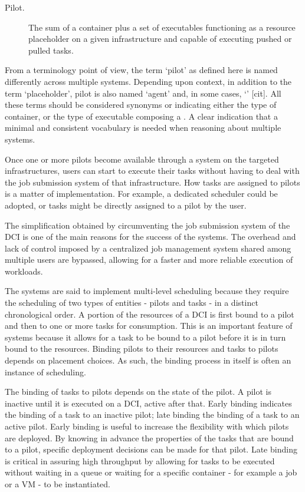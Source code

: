 \documentclass{sig-alternate}
\begin{document}
\begin{description}

\item[Pilot.] The sum of a container plus a set of executables
functioning as a resource placeholder on a given infrastructure and
capable of executing pushed or pulled tasks.


\end{description}

From a terminology point of view, the term `pilot' as defined here is
named differently across multiple \pilotjob systems. Depending upon
context, in addition to the term `placeholder', pilot is also named
`agent' and, in some cases, `\pilotjob' [cit]. All these terms should be
considered synonyms or indicating either the type of container, or the
type of executable composing a \pilot. A clear indication that a minimal
and consistent vocabulary is needed when reasoning about multiple
\pilotjob systems.

Once one or more pilots become available through a \pilotjob system on the
targeted infrastructures, users can start to execute their tasks without
having to deal with the job submission system of that infrastructure.
How tasks are assigned to pilots is a matter of implementation. For example, a
dedicated scheduler could be adopted, or tasks might be directly assigned to a
pilot by the user.

The simplification obtained by circumventing the job submission system of the
DCI is one of the main reasons for the success of the \pilotjob systems. The
overhead and lack of control imposed by a centralized job management system
shared among multiple users are bypassed, allowing for a faster and more
reliable execution of workloads.

The \pilotjob systems are said to implement multi-level scheduling
because they require the scheduling of two types of entities - pilots
and tasks - in a distinct chronological order. A portion of the
resources of a DCI is first bound to a pilot and then to one or more
tasks for consumption. This is an important feature of \pilotjob systems
because it allows for a task to be bound to a pilot before it is in turn
bound to the resources. Binding pilots to their resources and tasks to
pilots depends on placement choices. As such, the binding process in
itself is often an instance of scheduling.

The binding of tasks to pilots depends on the state of the pilot. A pilot is
inactive until it is executed on a DCI, active after that. Early binding
indicates the binding of a task to an inactive pilot; late binding the binding
of a task to an active pilot. Early binding is useful to increase the
flexibility with which pilots are deployed. By knowing in advance the
properties of the tasks that are bound to a pilot, specific deployment
decisions can be made for that pilot. Late binding is critical in assuring high
throughput by allowing for tasks to be executed without waiting in a queue or
waiting for a specific container - for example a job or a VM - to be
instantiated.
\end{document}
